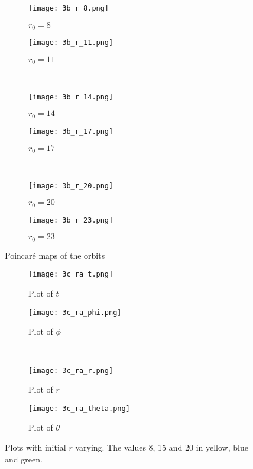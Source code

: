 \documentclass[12pt]{extarticle}
\begin{document}
\begin{figure}[h]
    \centering
    \begin{subfigure}[b]{0.4\textwidth}
        \texttt{[image: 3b\_r\_8.png]}
        \caption{$r_0 = 8 $}
        \label{figure:6a}
    \end{subfigure}  
    \qquad
    \begin{subfigure}[b]{0.4\textwidth}
        \texttt{[image: 3b\_r\_11.png]}
        \caption{$r_0 = 11 $}
        \label{figure:6b}
    \end{subfigure} 
    \\
    \begin{subfigure}[b]{0.4\textwidth}
        \texttt{[image: 3b\_r\_14.png]}
        \caption{$r_0 = 14 $}
        \label{figure:6c}
    \end{subfigure}
    \qquad
    \begin{subfigure}[b]{0.4\textwidth}
        \texttt{[image: 3b\_r\_17.png]}
        \caption{$r_0 = 17 $}
        \label{figure:6d}
    \end{subfigure}  
    \\
    \begin{subfigure}[b]{0.4\textwidth}
        \texttt{[image: 3b\_r\_20.png]}
        \caption{$r_0 =20 $}
        \label{figure:6e}
    \end{subfigure} 
    \qquad
    \begin{subfigure}[b]{0.4\textwidth}
        \texttt{[image: 3b\_r\_23.png]}
        \caption{$r_0 = 23 $}
        \label{figure:6f}
    \end{subfigure} 
    \caption{Poincar\'e maps of the orbits} 
    \label{figure 6}
\end{figure}

\begin{figure}[h]
    \centering
    \begin{subfigure}[b]{0.4\textwidth}
        \texttt{[image: 3c\_ra\_t.png]}
        \caption{Plot of $t$}
        \label{figure:7a}
    \end{subfigure}  
    \qquad
    \begin{subfigure}[b]{0.4\textwidth}
        \texttt{[image: 3c\_ra\_phi.png]}
        \caption{Plot of $\phi$}
        \label{figure:7b}
    \end{subfigure} 
    \\ 
    \begin{subfigure}[b]{0.4\textwidth}
        \texttt{[image: 3c\_ra\_r.png]}
        \caption{Plot of $r$}
        \label{figure:7c}
    \end{subfigure} 
    \qquad
    \begin{subfigure}[b]{0.4\textwidth}
        \texttt{[image: 3c\_ra\_theta.png]}
        \caption{Plot of $\theta$}
        \label{figure:7d}
    \end{subfigure}
    \caption{Plots with initial $r$ varying. The values 8, 15 and 20 in yellow, blue and green.}
    \label{figure 7}
\end{figure}
\end{document}
